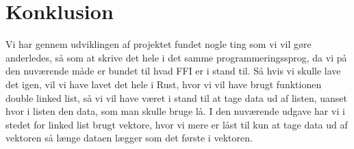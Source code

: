 \documentclass[a4paper, 12pt]{article}
\begin{document}
\section{Konklusion}
Vi har gennem udviklingen af projektet fundet nogle ting som vi vil gøre anderledes, så som at skrive det hele i det samme programmeringssprog, da vi på den nuværende måde er bundet til hvad FFI er i stand til. Så hvis vi skulle lave det igen, vil vi have lavet det hele i Rust, hvor vi vil have brugt funktionen double linked list, så vi vil have været i stand til at tage data ud af listen, uanset hvor i listen den data, som man skulle bruge lå. I den nuværende udgave har vi i stedet for linked list brugt vektore, hvor vi mere er låst til kun at tage data ud af vektoren så længe dataen lægger som det første i vektoren.

\bigbreak



\vfill
\pagebreak
\end{document}

